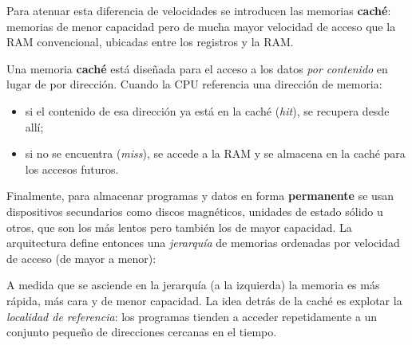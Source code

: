 \documentclass[11pt,a4paper]{article}
\begin{document}
Para atenuar esta diferencia de velocidades se introducen las memorias
\textbf{caché}: memorias de menor capacidad pero de mucha mayor velocidad
de acceso que la RAM convencional, ubicadas entre los registros y la
RAM.

\begin{definicion}
Una memoria \textbf{caché} está diseñada para el acceso a los datos
\emph{por contenido} en lugar de por dirección. Cuando la CPU referencia
una dirección de memoria:
\begin{itemize}[leftmargin=*,nosep]
    \item si el contenido de esa dirección ya está en la caché
        (\emph{hit}), se recupera desde allí;
    \item si no se encuentra (\emph{miss}), se accede a la RAM y se
        almacena en la caché para los accesos futuros.
\end{itemize}
\end{definicion}

Finalmente, para almacenar programas y datos en forma \textbf{permanente}
se usan dispositivos secundarios como discos magnéticos, unidades de
estado sólido u otros, que son los más lentos pero también los de mayor
capacidad. La arquitectura define entonces una \emph{jerarquía} de
memorias ordenadas por velocidad de acceso (de mayor a menor):

\begin{center}
\end{center}

\begin{idea}
A medida que se asciende en la jerarquía (a la izquierda) la memoria es
más rápida, más cara y de menor capacidad. La idea detrás de la caché es
explotar la \emph{localidad de referencia}: los programas tienden a
acceder repetidamente a un conjunto pequeño de direcciones cercanas en
el tiempo.
\end{idea}
\end{document}

